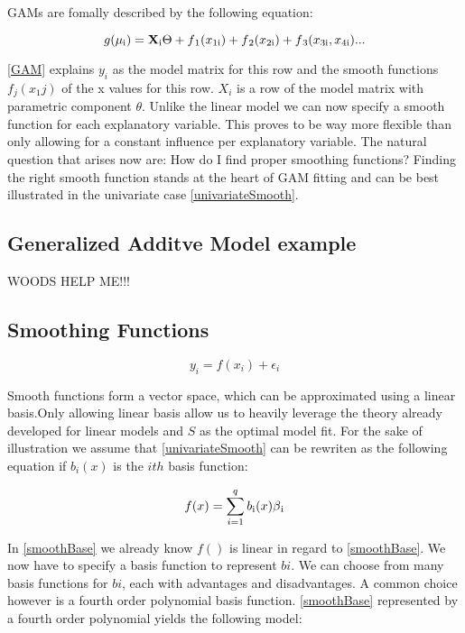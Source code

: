\documentclass{article}
\begin{document}
    GAMs are fomally described by the following equation:

    \begin{equation} \label{GAM} g(\mu\textsubscript{i}) = \mathbf{X} \textsubscript{i} \Theta + f\textsubscript{1}(x\textsubscript{1i}) + f\textsubscript{2}(x\textsubscript{2i}) + f\textsubscript{3}(x\textsubscript{3i}, x\textsubscript{4i}) ... \end{equation}

    \ref{GAM} explains $y_i$ as the model matrix for this row and the smooth functions $f_j(x_1j)$ of the x values for this row. $X_i$ is a row of the model matrix with parametric component $\theta$. Unlike the linear model we can now  specify a smooth function for each explanatory variable. This proves to be way more flexible than only allowing for a constant influence per explanatory variable. The natural question that arises now are: How do I find proper smoothing functions? Finding the right smooth function stands at the heart of GAM fitting and can be best illustrated in the univariate case \ref{univariateSmooth}.

    \subsection{Generalized Additve Model example}
    WOODS HELP ME!!!
    \subsection{Smoothing Functions}
     \begin{equation} \label{univariateSmooth} y_i = f(x_i) + \epsilon_i \end{equation}

     Smooth functions form a vector space, which can be approximated using a linear basis.Only allowing linear basis allow us to heavily leverage the theory already developed for linear models and $S$ as the optimal model fit. For the sake of illustration we assume that \ref{univariateSmooth} can be rewriten as the following equation if $b_i(x)$ is the $ith$ basis function:

    \begin{equation} \label{smoothBase} f(x) = \sum_{i=1}^{q} b\textsubscript{i} (x) \beta \textsubscript{i} \end{equation}

    In \ref{smoothBase} we already know $f()$ is linear in regard to \ref{smoothBase}. We now have to specify a basis function to represent $bi$. We can choose from many basis functions for $bi$, each with advantages and disadvantages. A common choice however is a fourth order polynomial basis function. \ref{smoothBase} represented by a fourth order polynomial yields the following model:
\end{document}
